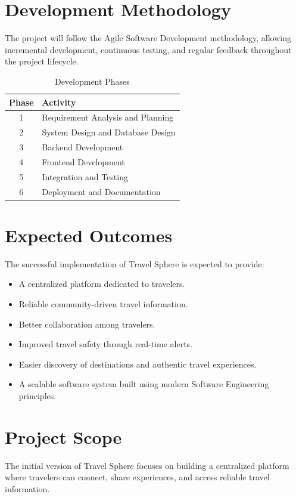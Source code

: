 \documentclass[12pt,a4paper]{article}
\begin{document}
\section{Development Methodology}
The project will follow the Agile Software Development methodology, allowing incremental development, continuous testing, and regular feedback throughout the project lifecycle.

\begin{table}[H]
\centering
\renewcommand{\arraystretch}{1.2}
\begin{tabular}{|c|p{10.5cm}|}
\hline
\textbf{Phase} & \textbf{Activity} \\ \hline
1 & Requirement Analysis and Planning \\ \hline
2 & System Design and Database Design \\ \hline
3 & Backend Development \\ \hline
4 & Frontend Development \\ \hline
5 & Integration and Testing \\ \hline
6 & Deployment and Documentation \\ \hline
\end{tabular}
\caption{Development Phases}
\end{table}

\section{Expected Outcomes}
The successful implementation of Travel Sphere is expected to provide:
\begin{itemize}
    \item A centralized platform dedicated to travelers.
    \item Reliable community-driven travel information.
    \item Better collaboration among travelers.
    \item Improved travel safety through real-time alerts.
    \item Easier discovery of destinations and authentic travel experiences.
    \item A scalable software system built using modern Software Engineering principles.
\end{itemize}

\section{Project Scope}
The initial version of Travel Sphere focuses on building a centralized platform where travelers can connect, share experiences, and access reliable travel information.
\end{document}
